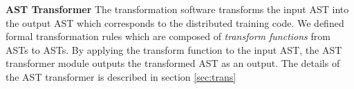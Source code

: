 \textbf{AST Transformer}
The transformation software transforms the input AST into the output AST
which corresponds to the distributed training code.
We defined formal transformation rules which are composed of
\textit{transform functions} from ASTs to ASTs.
By applying the transform function to the input AST,
the AST transformer module outputs the transformed AST as an output.
The details of the AST transformer is described in section \ref{sec:trans}
